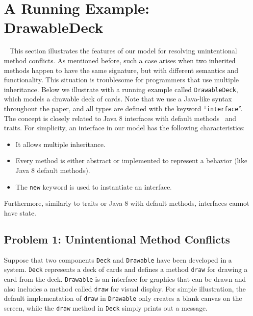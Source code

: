 \section{A Running Example: DrawableDeck}~\label{sec:overview}
This section illustrates the features of our model for
resolving unintentional method conflicts. As mentioned before, such a
case arises when two inherited methods happen to have the same
signature, but with different semantics and functionality. This
situation is troublesome for programmers that use multiple
inheritance. Below we illustrate with a running example called
\lstinline|DrawableDeck|, which models a drawable deck of cards. 
Note that we use a Java-like syntax
throughout the paper, and all types are defined with the keyword
``\lstinline|interface|''. The concept is closely related to Java 8
interfaces with default methods~\cite{bono14} and traits. For simplicity, an interface in our model has
the following characteristics:
\begin{itemize}
  \item It allows multiple inheritance.
  \item Every method is either abstract or implemented to represent a behavior (like Java 8 default methods). 
  \item The \lstinline|new| keyword is used to instantiate an interface.
\end{itemize}
Furthermore, similarly to traits or Java 8 with default methods,
interfaces cannot have state.



\subsection{Problem 1: Unintentional Method Conflicts}
Suppose that two components \lstinline|Deck| and \lstinline|Drawable| 
have been developed in a system. \lstinline|Deck| represents a deck
of cards and defines a method \lstinline|draw| for drawing a card from the
deck.  \lstinline|Drawable| is an interface for graphics that
can be drawn and also includes a method called \lstinline|draw| for
visual display. For simple illustration, the default implementation of
\lstinline|draw| in \lstinline|Drawable| only creates a blank canvas
on the screen, while the \lstinline|draw| method in \lstinline|Deck| simply
prints out a message.

